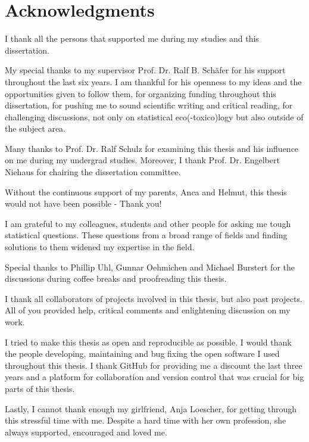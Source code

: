 


\begingroup
\let\clearpage\relax
\let\cleardoublepage\relax
\let\cleardoublepage\relax

\chapter*{Acknowledgments}
\thispagestyle{empty}

I thank all the persons that supported me during my studies and this dissertation.

\noindent My special thanks to my supervisor Prof. Dr. Ralf B. Schäfer for his support throughout the last six years. 
I am thankful for his openness to my ideas and the opportunities given to follow them, 
for organizing funding throughout this dissertation, 
for pushing me to sound scientific writing and critical reading, 
for challenging discussions, not only on statistical eco(-toxico)logy but also outside of the subject area.

\noindent Many thanks to Prof. Dr. Ralf Schulz for examining this thesis and his influence on me during my undergrad studies.
Moreover, I thank Prof. Dr. Engelbert Niehaus for chairing the dissertation committee.

\noindent Without the continuous support of my parents, Anca and Helmut, this thesis would not have been possible - Thank you!

\noindent I am grateful to my colleagues, students and other people for asking me tough statistical questions. 
These questions from a broad range of fields and finding solutions to them widened my expertise in the field.

\noindent Special thanks to Phillip Uhl, Gunnar Oehmichen and Michael Burstert for the discussions during coffee breaks and proofreading this thesis.

\noindent I thank all collaborators of projects involved in this thesis, but also past projects. All of you provided help, critical comments and enlightening discussion on my work.

\noindent I tried to make this thesis as open and reproducible as possible. I would thank the people developing, maintaining and bug fixing the open software I used throughout this thesis. I thank GitHub for providing me a discount the last three years and a platform for collaboration and version control that was crucial for big parts of this thesis. 

\noindent Lastly, I cannot thank enough my girlfriend, Anja Loescher, for getting through this stressful time with me.
Despite a hard time with her own profession, she always supported, encouraged and loved me. 


\endgroup 
